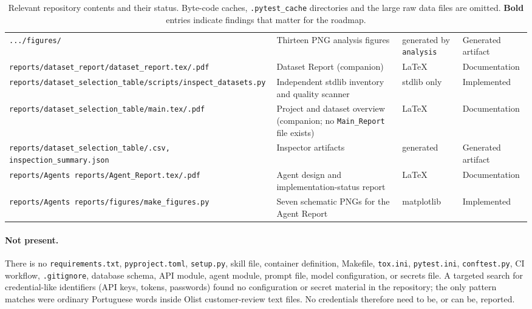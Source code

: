 \documentclass[11pt,a4paper]{article}
\newcommand{\code}[1]{\texttt{#1}}
\begin{document}
\begin{table}[H]
\begin{tabularx}{\textwidth}{L{4.6cm}L{5.3cm}L{2.4cm}L{2.1cm}}
\code{.../figures/} & Thirteen PNG analysis figures & generated by \code{analysis} & Generated artifact \\
\code{reports/\allowbreak dataset\_report/\allowbreak dataset\_report.tex/.pdf} & Dataset Report (companion) & \LaTeX{} & Documentation \\
\code{reports/\allowbreak dataset\_selection\_table/\allowbreak scripts/inspect\_datasets.py} & Independent stdlib inventory and quality scanner & stdlib only & Implemented \\
\code{reports/\allowbreak dataset\_selection\_table/\allowbreak main.tex/.pdf} & Project and dataset overview (companion; no \code{Main\_Report} file exists) & \LaTeX{} & Documentation \\
\code{reports/\allowbreak dataset\_selection\_table/\allowbreak *.csv, inspection\_summary.json} & Inspector artifacts & generated & Generated artifact \\
\code{reports/\allowbreak Agents reports/\allowbreak Agent\_Report.tex/.pdf} & Agent design and implementation-status report & \LaTeX{} & Documentation \\
\code{reports/\allowbreak Agents reports/\allowbreak figures/make\_figures.py} & Seven schematic PNGs for the Agent Report & matplotlib & Implemented \\
\bottomrule
\end{tabularx}
\caption{Relevant repository contents and their status. Byte-code caches, \code{.pytest\_cache} directories and the large raw data files are omitted. \textbf{Bold} entries indicate findings that matter for the roadmap.}
\label{tab:repo}
\end{table}

\paragraph{Not present.} There is no \code{requirements.txt}, \code{pyproject.toml}, \code{setup.py}, skill file, container definition, Makefile, \code{tox.ini}, \code{pytest.ini}, \code{conftest.py}, CI workflow, \code{.gitignore}, database schema, API module, agent module, prompt file, model configuration, or secrets file. A targeted search for credential-like identifiers (API keys, tokens, passwords) found no configuration or secret material in the repository; the only pattern matches were ordinary Portuguese words inside Olist customer-review text files. No credentials therefore need to be, or can be, reported.

\end{document}
